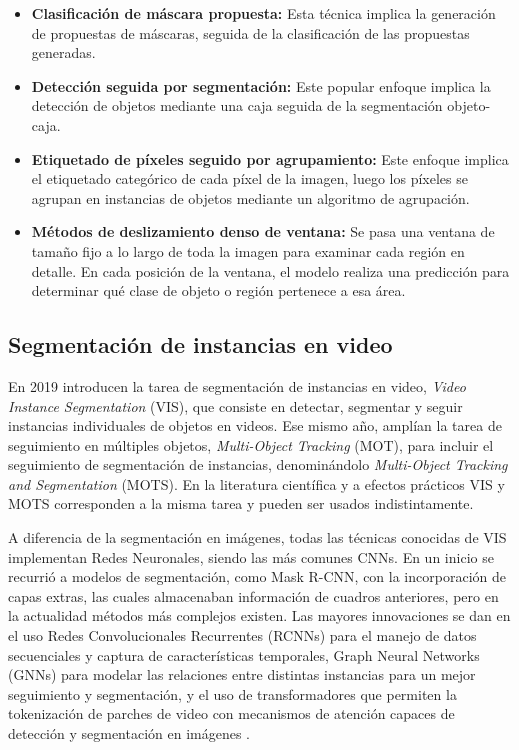\begin{itemize}
\setlength\itemsep{-0.3em}
    \item \textbf{Clasificación de máscara propuesta:} Esta técnica implica la generación de propuestas de máscaras, seguida de la clasificación de las propuestas generadas.
    \item \textbf{Detección seguida por segmentación:} Este popular enfoque implica la detección de objetos mediante una caja seguida de la segmentación objeto-caja.
    \item \textbf{Etiquetado de píxeles seguido por agrupamiento:} Este enfoque implica el etiquetado categórico de cada píxel de la imagen, luego los píxeles se agrupan en instancias de objetos mediante un algoritmo de agrupación.
    \item \textbf{Métodos de deslizamiento denso de ventana:} Se pasa una ventana de tamaño fijo a lo largo de toda la imagen para examinar cada región en detalle. En cada posición de la ventana, el modelo realiza una predicción para determinar qué clase de objeto o región pertenece a esa área.
\end{itemize}

\subsection{Segmentación de instancias en video}
En 2019 \cite[Yang et al]{Yang2019} introducen la tarea de segmentación de instancias en video, \textit{Video Instance Segmentation} (VIS), que consiste en detectar, segmentar y seguir instancias individuales de objetos en videos. Ese mismo año, \cite[Voigtlaender et al.]{Voigtlaender2019} amplían la tarea de seguimiento en múltiples objetos, \textit{Multi-Object Tracking} (MOT), para incluir el seguimiento de segmentación de instancias, denominándolo \textit{Multi-Object Tracking and Segmentation} (MOTS). En la literatura científica y a efectos prácticos VIS y MOTS corresponden a la misma tarea y pueden ser usados indistintamente.

A diferencia de la segmentación en imágenes, todas las técnicas conocidas de VIS implementan Redes Neuronales, siendo las más comunes CNNs. En un inicio se recurrió a modelos de segmentación, como Mask R-CNN, con la incorporación de capas extras, las cuales almacenaban información de cuadros anteriores, pero en la actualidad métodos más complejos existen. Las mayores innovaciones se dan en el uso Redes Convolucionales Recurrentes (RCNNs) para el manejo de datos secuenciales y captura de características temporales, Graph Neural Networks (GNNs) para modelar las relaciones entre distintas instancias para un mejor seguimiento y segmentación, y el uso de transformadores que permiten la tokenización de parches de video con mecanismos de atención capaces de detección y segmentación en imágenes \cite{Zhou2023}.

